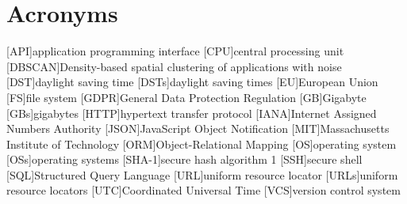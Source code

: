 \chapter*{Acronyms}
\begin{acronym}
    [API]{application programming interface}
    [CPU]{central processing unit}
    [DBSCAN]{Density-based spatial clustering of applications with noise}
    [DST]{daylight saving time}
    [DSTs]{daylight saving times}
    [EU]{European Union}
    [FS]{file system}
    [GDPR]{General Data Protection Regulation}
    [GB]{Gigabyte}
    [GBs]{gigabytes}
    [HTTP]{hypertext transfer protocol}
    [IANA]{Internet Assigned Numbers Authority}
    [JSON]{JavaScript Object Notification}
    [MIT]{Massachusetts Institute of Technology}
    [ORM]{Object-Relational Mapping}
    [OS]{operating system}
    [OSs]{operating systems}
    [SHA-1]{secure hash algorithm 1}
    [SSH]{secure shell}
    [SQL]{Structured Query Language}
    [URL]{uniform resource locator}
    [URLs]{uniform resource locators}
    [UTC]{Coordinated Universal Time}
    [VCS]{version control system}
\end{acronym}
